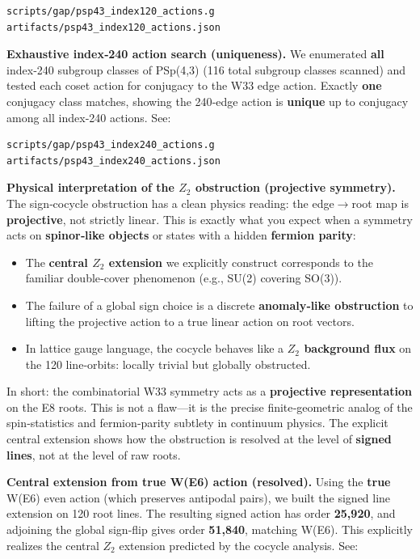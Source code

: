 \documentclass[11pt]{article}
\providecommand{\tightlist}{%
  \setlength{\itemsep}{0pt}\setlength{\parskip}{0pt}}
\begin{document}
\begin{verbatim}
scripts/gap/psp43_index120_actions.g
artifacts/psp43_index120_actions.json
\end{verbatim}

\textbf{Exhaustive index‑240 action search (uniqueness).} We enumerated
\textbf{all} index‑240 subgroup classes of PSp(4,3) (116 total subgroup
classes scanned) and tested each coset action for conjugacy to the W33
edge action. Exactly \textbf{one} conjugacy class matches, showing the
240‑edge action is \textbf{unique} up to conjugacy among all index‑240
actions. See:

\begin{verbatim}
scripts/gap/psp43_index240_actions.g
artifacts/psp43_index240_actions.json
\end{verbatim}

\textbf{Physical interpretation of the \(Z_{2}\) obstruction (projective
symmetry).}\\
The sign‑cocycle obstruction has a clean physics reading: the
edge\ensuremath{\rightarrow}root map is \textbf{projective}, not
strictly linear. This is exactly what you expect when a symmetry acts on
\textbf{spinor‑like objects} or states with a hidden \textbf{fermion
parity}:

\begin{itemize}
\tightlist
\item
  The \textbf{central \(Z_{2}\) extension} we explicitly construct
  corresponds to the familiar double‑cover phenomenon (e.g., SU(2)
  covering SO(3)).\\
\item
  The failure of a global sign choice is a discrete \textbf{anomaly‑like
  obstruction} to lifting the projective action to a true linear action
  on root vectors.\\
\item
  In lattice gauge language, the cocycle behaves like a
  \textbf{\(Z_{2}\) background flux} on the 120 line‑orbits: locally
  trivial but globally obstructed.
\end{itemize}

In short: the combinatorial W33 symmetry acts as a \textbf{projective
representation} on the E8 roots. This is not a flaw---it is the precise
finite‑geometric analog of the spin‑statistics and fermion‑parity
subtlety in continuum physics. The explicit central extension shows how
the obstruction is resolved at the level of \textbf{signed lines}, not
at the level of raw roots.

\textbf{Central extension from true W(E6) action (resolved).} Using the
\textbf{true} W(E6) even action (which preserves antipodal pairs), we
built the signed line extension on 120 root lines. The resulting signed
action has order \textbf{25,920}, and adjoining the global sign‑flip
gives order \textbf{51,840}, matching W(E6). This explicitly realizes
the central \(Z_{2}\) extension predicted by the cocycle analysis. See:
\end{document}
